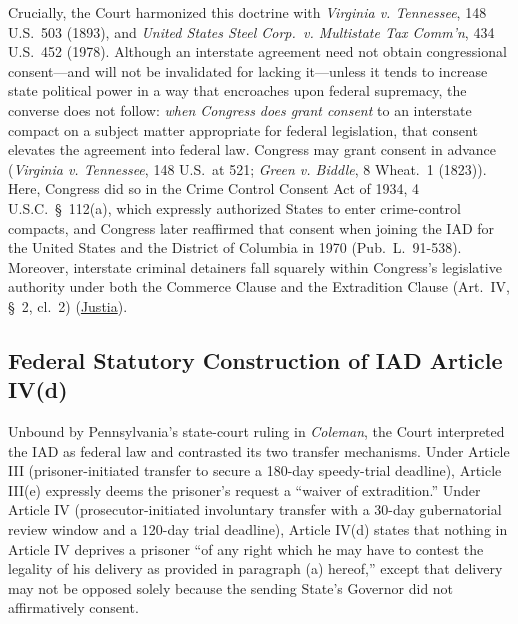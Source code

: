 \documentclass[12pt]{article}
\begin{document}
Crucially, the Court harmonized this doctrine with \textit{Virginia v. Tennessee}, 148 U.S.\ 503 (1893), and \textit{United States Steel Corp.\ v. Multistate Tax Comm'n}, 434 U.S.\ 452 (1978). Although an interstate agreement need not obtain congressional consent---and will not be invalidated for lacking it---unless it tends to increase state political power in a way that encroaches upon federal supremacy, the converse does not follow: \textit{when Congress does grant consent} to an interstate compact on a subject matter appropriate for federal legislation, that consent elevates the agreement into federal law. Congress may grant consent in advance (\textit{Virginia v. Tennessee}, 148 U.S.\ at 521; \textit{Green v. Biddle}, 8 Wheat.\ 1 (1823)). Here, Congress did so in the Crime Control Consent Act of 1934, 4 U.S.C.\ \S\ 112(a), which expressly authorized States to enter crime-control compacts, and Congress later reaffirmed that consent when joining the IAD for the United States and the District of Columbia in 1970 (Pub.\ L.\ 91-538). Moreover, interstate criminal detainers fall squarely within Congress's legislative authority under both the Commerce Clause and the Extradition Clause (Art.\ IV, \S\ 2, cl.\ 2) (\href{https://supreme.justia.com/cases/federal/us/449/433/}{Justia}).

\subsection{Federal Statutory Construction of IAD Article IV(d)}
Unbound by Pennsylvania's state-court ruling in \textit{Coleman}, the Court interpreted the IAD as federal law and contrasted its two transfer mechanisms. Under Article III (prisoner-initiated transfer to secure a 180-day speedy-trial deadline), Article III(e) expressly deems the prisoner's request a ``waiver of extradition.'' Under Article IV (prosecutor-initiated involuntary transfer with a 30-day gubernatorial review window and a 120-day trial deadline), Article IV(d) states that nothing in Article IV deprives a prisoner ``of any right which he may have to contest the legality of his delivery as provided in paragraph (a) hereof,'' except that delivery may not be opposed solely because the sending State's Governor did not affirmatively consent.
\end{document}
